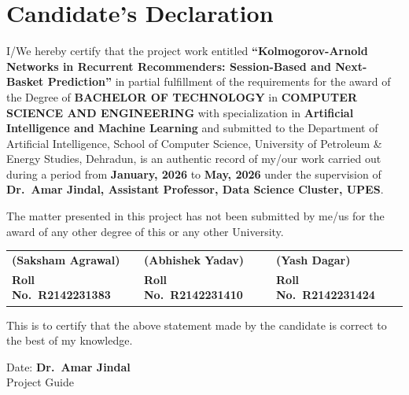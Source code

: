 
\chapter*{Candidate's Declaration}

I/We hereby certify that the project work entitled
\textbf{``Kolmogorov-Arnold Networks in Recurrent Recommenders: Session-Based and
Next-Basket Prediction''}
in partial fulfillment of the requirements for the award of the Degree of
\textbf{BACHELOR OF TECHNOLOGY} in
\textbf{COMPUTER SCIENCE AND ENGINEERING}
with specialization in \textbf{Artificial Intelligence and Machine Learning}
and submitted to the Department of Artificial Intelligence, School of Computer Science,
University of Petroleum \& Energy Studies, Dehradun, is an authentic record of
my/our work carried out during a period from \textbf{January, 2026} to
\textbf{May, 2026} under the supervision of
\textbf{Dr.\ Amar Jindal, Assistant Professor, Data Science Cluster, UPES}.

The matter presented in this project has not been submitted by me/us for the award
of any other degree of this or any other University.

\vspace{2cm}

\noindent
\begin{tabular}{p{4cm} p{4cm} p{4cm}}
\textbf{(Saksham Agrawal)} & \textbf{(Abhishek Yadav)} & \textbf{(Yash Dagar)} \\
\textbf{Roll No.\ R2142231383} & \textbf{Roll No.\ R2142231410} & \textbf{Roll No.\ R2142231424} \\
\end{tabular}

\vspace{1.5cm}
\noindent
This is to certify that the above statement made by the candidate is correct to the
best of my knowledge.

\vspace{1.5cm}

\noindent
Date: \underline{\hspace{3cm}} \hfill \textbf{Dr.\ Amar Jindal}\\
\hfill Project Guide

